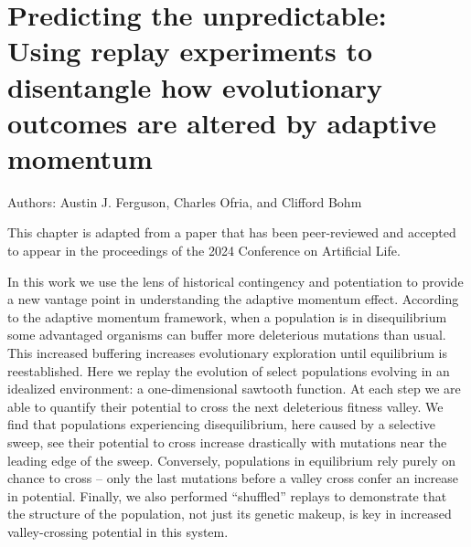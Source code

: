 \chapter{Predicting the unpredictable: Using replay experiments to disentangle how evolutionary outcomes are altered by adaptive momentum}
\label{chap:adaptive_momentum}

\noindent
Authors: Austin J. Ferguson, Charles Ofria, and Clifford Bohm 

\noindent This chapter is adapted from a paper that has been peer-reviewed and accepted to appear in the proceedings of the 2024 Conference on Artificial Life. 

In this work we use the lens of historical contingency and potentiation to provide a new vantage point in understanding the adaptive momentum effect. 
According to the adaptive momentum framework, when a population is in disequilibrium some advantaged organisms can buffer more deleterious mutations than usual. 
This increased buffering increases evolutionary exploration until equilibrium is reestablished. 
Here we replay the evolution of select populations evolving in an idealized environment: a one-dimensional sawtooth function.
At each step we are able to quantify their potential to cross the next deleterious fitness valley. 
We find that populations experiencing disequilibrium, here caused by a selective sweep, see their potential to cross increase drastically with mutations near the leading edge of the sweep. 
Conversely, populations in equilibrium rely purely on chance to cross -- only the last mutations before a valley cross confer an increase in potential. 
Finally, we also performed ``shuffled'' replays to demonstrate that the structure of the population, not just its genetic makeup, is key in increased valley-crossing potential in this system. 



